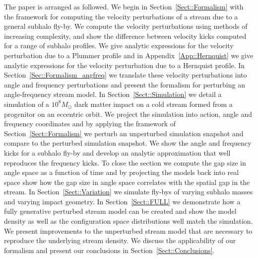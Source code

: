 \documentclass[useAMS,usenatbib,fleqn,a4paper]{mn2e}
\begin{document}
The paper is arranged as followed. We begin in Section~\ref{Sect::Formalism} with the framework for computing the velocity perturbations of a stream due to a general subhalo fly-by. We compute the velocity perturbations using methods of increasing complexity, and show the difference between velocity kicks computed for a range of subhalo profiles. We give analytic expressions for the velocity perturbation due to a Plummer profile and in Appendix~\ref{App::Hernquist} we give analytic expressions for the velocity perturbation due to a Hernquist profile. In Section~\ref{Sec::Formalism_angfreq} we translate these velocity perturbations into angle and frequency perturbations and present the formalism for perturbing an angle-frequency stream model. In Section~\ref{Sect::Simulation} we detail a simulation of a $10^8M_\odot$ dark matter impact on a cold stream formed from a progenitor on an eccentric orbit. We project the simulation into action, angle and frequency coordinates and by applying the framework of Section~\ref{Sect::Formalism} we perturb an unperturbed simulation snapshot and compare to the perturbed simulation snapshot. We show the angle and frequency kicks for a subhalo fly-by and develop an analytic approximation that well reproduces the frequency kicks. To close the section we compute the gap size in angle space as a function of time and by projecting the models back into real space show how the gap size in angle space correlates with the spatial gap in the stream.  In Section~\ref{Sect::Variation} we simulate fly-bys of varying subhalo masses and varying impact geometry. In Section~\ref{Sect::FULL} we demonstrate how a fully generative perturbed stream model can be created and show the model density as well as the configuration space distributions well match the simulation. We present improvements to the unperturbed stream model that are necessary to reproduce the underlying stream density. We discuss the applicability of our formalism and present our conclusions in Section~\ref{Sect::Conclusions}.
\end{document}

